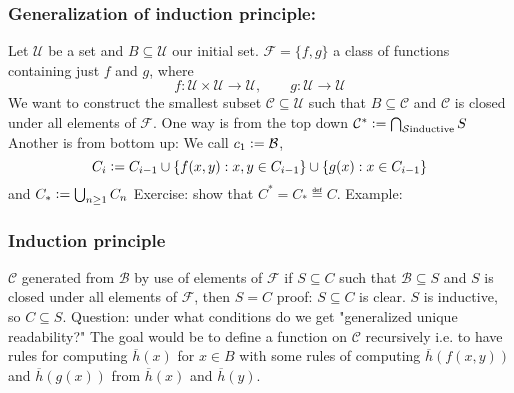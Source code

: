 \subsubsection*{Generalization of induction principle:}
Let $\mathcal{U}$ be a set and $B\subseteq \mathcal{U}$ our initial set.
$\mathcal{F} = \{f,g\}$ a class of functions containing just $f$ and $g$, where $$f:\mathcal{U}\times \mathcal{U}\to \mathcal{U}, \qquad g: \mathcal{U}\to \mathcal{U}$$
We want to construct the smallest subset $\mathcal{C}\subseteq \mathcal{U}$ such that $B\subseteq \mathcal{C}$ and $\mathcal{C}$ is closed under all elements of $\mathcal{F}$.
One way is from the top down $\mathcal{C}^* \vcentcolon= \bigcap_{\mathcal{S} \text{inductive}}{S}$
Another is from bottom up: We call $c_1 \vcentcolon= \mathcal{B}$, 
$$C_i \vcentcolon= C_{i-1} \cup \{f(x,y) : x,y\in C_{i-1}\}\cup \{g(x) : x\in C_{i-1}\}$$
and $C_* \vcentcolon= \bigcup_{n\geq 1}{C_{n}}$
Exercise: show that $C^* = C_*\eqdef C$.
Example:
\subsubsection*{Induction principle}
$\mathcal{C}$ generated from $\mathcal{B}$ by use of elements of $\mathcal{F}$ if $S\subseteq C$ such that $\mathcal{B}\subseteq S$ and $S$ is closed under all
elements of $\mathcal{F}$, then $S = C$
proof: 
$S\subseteq C$ is clear. 
$S$ is inductive, so $C\subseteq S$.
Question: under what conditions do we get "generalized unique readability?"
The goal would be to define a function on $\mathcal{C}$ recursively i.e. to have rules for computing $\overline{h}(x)$ for $x\in B$
with some rules of computing $\overline{h}(f(x,y))$ and $\overline{h}(g(x))$ from $\overline{h}(x)$ and $\overline{h}(y)$.

